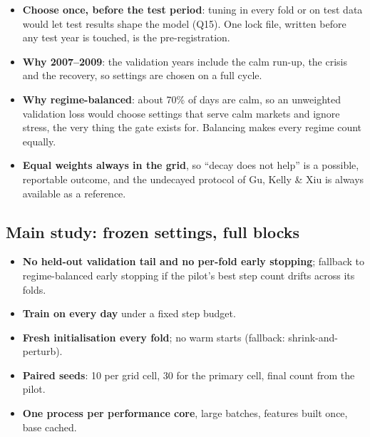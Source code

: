 \begin{whybox}
\begin{itemize}
\item \textbf{Choose once, before the test period}: tuning in every fold or on test data would let test results
  shape the model (Q15). One lock file, written before any test year is touched, is the pre-registration.
\item \textbf{Why 2007--2009}: the validation years include the calm run-up, the crisis and the recovery, so
  settings are chosen on a full cycle.
\item \textbf{Why regime-balanced}: about 70\% of days are calm, so an unweighted validation loss would choose
  settings that serve calm markets and ignore stress, the very thing the gate exists for. Balancing makes
  every regime count equally.
\item \textbf{Equal weights always in the grid}, so ``decay does not help'' is a possible, reportable outcome, and
  the undecayed protocol of Gu, Kelly \& Xiu is always available as a reference.
\end{itemize}
\end{whybox}

\subsection{Main study: frozen settings, full blocks}

\begin{itemize}
\item \textbf{No held-out validation tail and no per-fold early stopping}; fallback to regime-balanced early
  stopping if the pilot's best step count drifts across its folds.
\item \textbf{Train on every day} under a fixed step budget.
\item \textbf{Fresh initialisation every fold}; no warm starts (fallback: shrink-and-perturb).
\item \textbf{Paired seeds}: 10 per grid cell, 30 for the primary cell, final count from the pilot.
\item \textbf{One process per performance core}, large batches, features built once, base cached.
\end{itemize}

